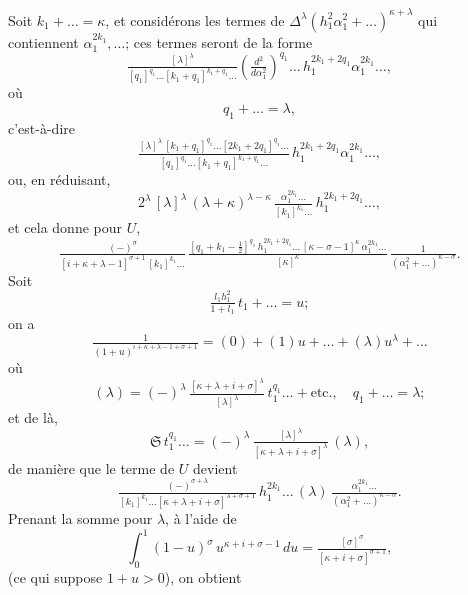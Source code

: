 \documentclass[12pt,a4paper]{article}
\providecommand{\fS}{\mathfrak{S}}
\begin{document}
Soit $k_1 + \ldots = \kappa$, et consid\'erons les termes de $\Delta^{\lambda}(h_1^2\alpha_1^2 + \ldots)^{\kappa + \lambda}$ qui contiennent $\alpha_1^{2k_1},\ldots$; ces termes seront de la forme
\[
\tfrac{[\lambda]^{\lambda}}{[q_1]^{q_1}\ldots [k_1 + q_1]^{k_1 + q_1}\ldots}\left(\tfrac{d^2}{d\alpha_1^2}\right)^{q_1}\ldots\,h_1^{2k_1 + 2q_1}\alpha_1^{2k_1}\ldots,
\]
o\`u
\[
q_1 + \ldots = \lambda,
\]
c'est-\`a-dire
\[
\tfrac{[\lambda]^{\lambda}\,[k_1 + q_1]^{q_1}\ldots [2k_1 + 2q_1]^{q_1}\ldots}{[q_1]^{q_1}\ldots [k_1 + q_1]^{k_1 + q_1}\ldots}\,h_1^{2k_1 + 2q_1}\alpha_1^{2k_1}\ldots,
\]
ou, en r\'eduisant,
\[
2^{\lambda}\,[\lambda]^{\lambda}\,(\lambda + \kappa)^{\lambda - \kappa}\,\tfrac{\alpha_1^{2k_1}\ldots}{[k_1]^{k_1}\ldots}\,h_1^{2k_1 + 2q_1}\ldots,
\]
et cela donne pour $U$,
\[
\tfrac{(-)^{\sigma}}{[i + \kappa + \lambda - 1]^{\sigma + 1}\,[k_1]^{k_1}\ldots}\,\tfrac{[q_1 + k_1 - \tfrac12]^{q_1}\,h_1^{2k_1 + 2q_1}\ldots\,[\kappa - \sigma - 1]^{\kappa}\,\alpha_1^{2k_1}\ldots}{[\kappa]^{\kappa}}\,\tfrac{1}{(\alpha_1^2 + \ldots)^{\kappa - \sigma}}.
\]
Soit
\[
\tfrac{l_1 h_1^2}{1 + l_1}\,t_1 + \ldots = u;
\]
on a
\[
\tfrac{1}{(1 + u)^{i + \kappa + \lambda - 1 + \sigma + 1}} = (0) + (1)u + \ldots + (\lambda)u^{\lambda} + \ldots
\]
o\`u
\[
(\lambda) = (-)^{\lambda}\,\tfrac{[\kappa + \lambda + i + \sigma]^{\lambda}}{[\lambda]^{\lambda}}\,t_1^{q_1}\ldots + \text{etc.},\quad q_1 + \ldots = \lambda;
\]
et de l\`a,
\[
\fS\,t_1^{q_1}\ldots = (-)^{\lambda}\,\tfrac{[\lambda]^{\lambda}}{[\kappa + \lambda + i + \sigma]^{\lambda}}\,(\lambda),
\]
de mani\`ere que le terme de $U$ devient
\[
\tfrac{(-)^{\sigma + \lambda}}{[k_1]^{k_1}\ldots [\kappa + \lambda + i + \sigma]^{\lambda + \sigma + 1}}\,h_1^{2k_1}\ldots\,(\lambda)\,\tfrac{\alpha_1^{2k_1}\ldots}{(\alpha_1^2 + \ldots)^{\kappa - \sigma}}.
\]
Prenant la somme pour $\lambda$, \`a l'aide de
\[
\int_0^1 (1 - u)^{\sigma}\,u^{\kappa + i + \sigma - 1}\,du = \tfrac{[\sigma]^{\sigma}}{[\kappa + i + \sigma]^{\sigma + 1}},
\]
(ce qui suppose $1 + u > 0$), on obtient

\newpage
\setcounter{page}{203}
\end{document}
